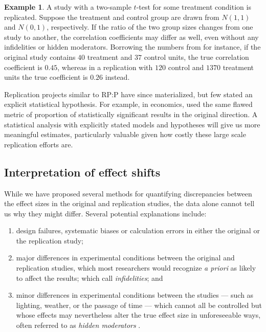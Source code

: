 \documentclass[11pt]{article}
\theoremstyle{definition}
\newtheorem{example}{Example}
\theoremstyle{custom}
\begin{document}
  \begin{example}
  \label{eg:unbal-t}
    A study with a two-sample $t$-test for some treatment condition is replicated. Suppose the treatment and control group are drawn from $N(1, 1)$ and $N(0, 1)$, respectively. If the ratio of the two group sizes changes from one study to another, the correlation coefficients may differ as well, even without any infidelities or hidden moderators. Borrowing the numbers from \citet{PurdieVaughns:2008en} for instance, if the original study contains $40$ treatment and $37$ control units, the true correlation coefficient is $0.45$, whereas in a replication with $120$ control and $1370$ treatment units the true coefficient is $0.26$ instead.
  \end{example}

  Replication projects similar to RP:P have since materialized, but few stated an explicit statistical hypothesis. For example, in economics, \citet{Camerer:2016cx} used the same flawed metric of proportion of statistically significant results in the original direction. A statistical analysis with explicitly stated models and hypotheses will give us more meaningful estimates, particularly valuable given how costly these large scale replication efforts are.


\subsection{Interpretation of effect shifts}

  While we have proposed several methods for quantifying discrepancies between the effect sizes in the original and replication studies, the data alone cannot tell us why they might differ. Several potential explanations include:
  \begin{enumerate}
  \item design failures, systematic biases or calculation errors in either the original or the replication study;
  \item major differences in experimental conditions between the original and replication studies, which most researchers would recognize {\em a priori} as likely to affect the results; which \citet{Gilbert:2016he} call {\em infidelities}; and
  \item minor differences in experimental conditions between the studies --- such as lighting, weather, or the passage of time --- which cannot all be controlled but whose effects may nevertheless alter the true effect size in unforeseeable ways, often referred to as {\em hidden moderators} \citep[e.g.][]{Srivastava:2015}.
  \end{enumerate}
\end{document}
